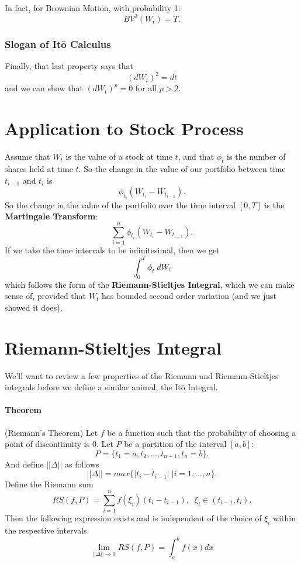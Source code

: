 \documentclass[a4paper,12pt]{scrartcl}
\begin{document}
      In fact, for Brownian Motion, with probability 1:
	 \[BV^2(W_t) = T.\]

\subsubsection{Slogan of It\={o} Calculus}
      
      Finally, that last property says that
      \[ (dW_t)^2 = dt \]
      and we can show that $(dW_t)^p = 0$ for all $p>2$.

\section{Application to Stock Process}

Assume that $W_t$ is the value of a stock at time $t$, and that $\phi_t$
is the number of shares held at time $t$.  So the change in the value
of our portfolio between time $t_{i-1}$ and $t_i$ is
   \[ \phi_{t_i} \left( W_{t_i} - W_{t_{i-1}} \right). \]
So the change in the value of the portfolio over the time interval
$[0,T]$ is the \textbf{Martingale Transform}:
   \[ \sum^n_{i=1}  \phi_{t_i} \left( W_{t_i} - W_{t_{i-1}} \right). \]
If we take the time intervals to be infinitesimal, then we get
   \[ \int_0^T \phi_t \; dW_t \]
which follows the form of the \textbf{Riemann-Stieltjes Integral}, which
we can make sense of, provided that $W_t$ has bounded second order 
variation (and we just showed it does).


\section{Riemann-Stieltjes Integral}

We'll want to review a few properties of the Riemann and
Riemann-Stieltjes integrals before we define a similar animal, the 
It\={o} Integral.

\paragraph{Theorem} (Riemann's Theorem) Let $f$ be a function such that
the probability of choosing a point of discontinuity is 0.  Let $P$
be a partition of the interval $[a,b]$:
   \[ P = \{ t_1 = a, t_2, \ldots, t_{n-1}, t_n = b \}. \]
And define $||\Delta||$ as follows
   \[ ||\Delta|| = max\{ |t_i - t_{i-1}| \; | i = 1, \ldots, n \}.\]
Define the Riemann sum
   \[ RS(f, P) = \sum^n_{i=1} f(\xi_i) (t_i - t_{i-1}), \;\; \xi_i \in
      (t_{i-1}, t_i).\]
Then the following expression exists and is independent of the choice
of $\xi_i$ within the respective intervals.
   \[ \lim_{||\Delta||\rightarrow 0} RS(f,P) = \int^b_a f(x) dx \]
\end{document}
